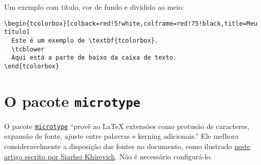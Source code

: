 \documentclass[a4paper]{article}
\newcommand{\code}[1]{\texttt{#1}}
\begin{document}
Um exemplo com título, cor de fundo e dividido ao meio:

\begin{verbatim}
\begin{tcolorbox}[colback=red!5!white,colframe=red!75!black,title=Meu título]
  Este é um exemplo de \textbf{tcolorbox}.
  \tcblower
  Aqui está a parte de baixo da caixa de texto.
\end{tcolorbox}
\end{verbatim}

\section{O pacote \code{microtype}}

O pacote \href{https://www.ctan.org/pkg/microtype}{\code{microtype}} “provê ao
\LaTeX{} extensões como protusão de caracteres, expansão de fonte, ajuste entre
palavras e kerning adicionais.” Ele melhora consideravelmente a disposição das
fontes no documento, como ilustrado
\href{http://www.khirevich.com/latex/microtype/}{neste artigo escrito por
Siarhei Khirevich}. Não é necessário configurá-lo.
\end{document}
